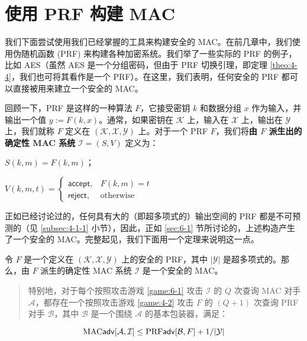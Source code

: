 \section{使用 PRF 构建 MAC}

我们下面尝试使用我们已经掌握的工具来构建安全的 MAC。在前几章中，我们使用伪随机函数 (PRF) 来构建各种加密系统。我们举了一些实际的 PRF 的例子，比如 AES（虽然 AES 是一个分组密码，但由于 PRF 切换引理，即定理 \ref{theo:4-4}，我们也可将其看作是一个 PRF）。在这里，我们表明，任何安全的 PRF 都可以直接被用来建立一个安全的 MAC。

回顾一下，PRF 是这样的一种算法 $F$，它接受密钥 $k$ 和数据分组 $x$ 作为输入，并输出一个值 $y:=F(k,x)$。通常，如果密钥在 $\mathcal{K}$ 上，输入在 $\mathcal{X}$ 上，输出在 $\mathcal{Y}$ 上，我们就称 $F$ 定义在 $(\mathcal{K},\mathcal{X},\mathcal{Y})$ 上。对于一个 PRF $F$，我们将\textbf{由 $F$ 派生出的确定性 MAC 系统} $\mathcal{I}=(S,V)$ 定义为：

\vspace{5pt}

\hspace*{5pt} $S(k,m)=F(k,m)$；

\vspace{5pt}

\hspace*{5pt} $
V(k,m,t)=\left\{
\begin{array}{ll}
\mathsf{accept}, & F(k,m)=t\\
\mathsf{reject}, & \text{otherwise}
\end{array}
\right.
$

\vspace{8pt}

正如已经讨论过的，任何具有大的（即超多项式的）输出空间的 PRF 都是不可预测的（见 \ref{subsec:4-1-1} 小节），因此，正如 \ref{sec:6-1} 节所讨论的，上述构造产生了一个安全的 MAC。完整起见，我们下面用一个定理来说明这一点。

\begin{theorem}\label{theo:6-2}
令 $F$ 是一个定义在 $(\mathcal{K},\mathcal{X},\mathcal{Y})$ 上的安全的 PRF，其中 $|\mathcal{Y}|$ 是超多项式的。那么，由 $F$ 派生的确定性 MAC 系统 $\mathcal{I}$ 是一个安全的 MAC。
\begin{quote}
特别地，对于每个按照攻击游戏 \ref{game:6-1} 攻击 $\mathcal{I}$ 的 $Q$ 次查询 MAC 对手 $\mathcal{A}$，都存在一个按照攻击游戏 \ref{game:4-2} 攻击 $F$ 的 $(Q+1)$ 次查询 PRF 对手 $\mathcal{B}$，其中 $\mathcal{B}$ 是一个围绕 $\mathcal{A}$ 的基本包装器，满足：
\end{quote}
\[
{\rm MAC}\mathsf{adv}[\mathcal{A},\mathcal{I}]\leq{\rm PRF\mathsf{adv}}[\mathcal{B}, F]+{1}/{|\mathcal{Y}|}
\]
\end{theorem}


